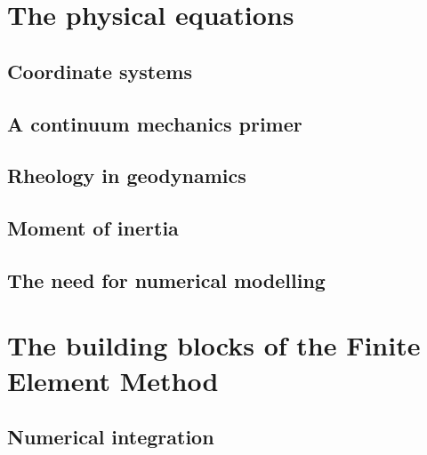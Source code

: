 \documentclass[a4paper]{article}
\begin{document}
\newpage
\section{The physical equations} %
\subsection{Coordinate systems}  \label{ss:coordsys} %
\subsection{A continuum mechanics primer} %
\subsection{Rheology in geodynamics}  %
\subsection{Moment of inertia} 
\subsection{The need for numerical modelling}

\newpage
\section{The building blocks of the Finite Element Method} %
\subsection{Numerical integration} \label{sec:quadrature} %
\end{document}
